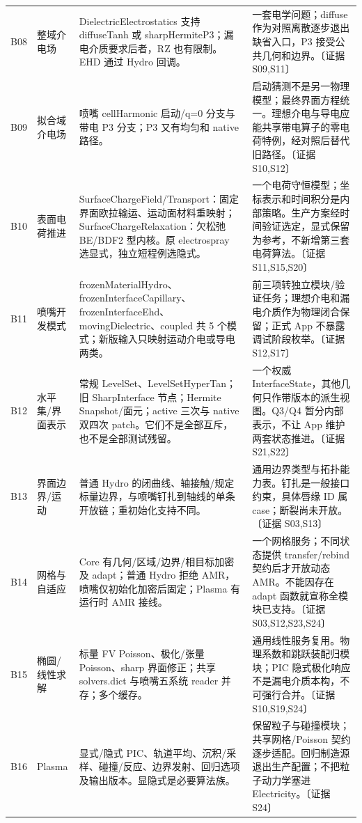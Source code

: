 \documentclass[UTF8,a4paper,11pt,fontset=fandol]{ctexart}
\numberwithin{equation}{section}
\newcommand{\ev}[1]{\textcolor{accent}{〔证据 #1〕}}
\begin{document}
\begin{longtable}{@{}P{.06\textwidth}P{.23\textwidth}P{.33\textwidth}P{.30\textwidth}@{}}
B08 & 整域介电场 & DielectricElectrostatics 支持 diffuseTanh 或 sharpHermiteP3；漏电介质要求后者，RZ 也有限制。EHD 通过 Hydro 回调。 & 一套电学问题；diffuse 作为对照离散逐步退出缺省入口，P3 接受公共几何和边界。\ev{S09,S11}\\
B09 & 拟合域介电场 & 喷嘴 cellHarmonic 启动/q=0 分支与带电 P3 分支；P3 又有均匀和 native 路径。 & 启动猜测不是另一物理模型；最终界面方程统一。理想介电与导电应能共享带电算子的零电荷特例，经对照后替代旧路径。\ev{S10,S12}\\
B10 & 表面电荷推进 & SurfaceChargeField/Transport：固定界面欧拉输运、运动面材料重映射；SurfaceChargeRelaxation：欠松弛 BE/BDF2 型内核。原 electrospray 选显式，独立短程例选隐式。 & 一个电荷守恒模型；坐标表示和时间积分是内部策略。生产方案经时间验证选定，显式保留为参考，不新增第三套电荷算法。\ev{S11,S15,S20}\\
B11 & 喷嘴开发模式 & frozenMaterialHydro、frozenInterfaceCapillary、frozenInterfaceEhd、movingDielectric、coupled 共 5 个模式；新版输入只映射运动介电或导电两类。 & 前三项转独立模块/验证任务；理想介电和漏电介质作为物理闭合保留；正式 App 不暴露调试阶段枚举。\ev{S12,S17}\\
B12 & 水平集/界面表示 & 常规 LevelSet、LevelSetHyperTan；旧 SharpInterface 节点；Hermite Snapshot/面元；active 三次与 native 双四次 patch。它们不是全部互斥，也不是全部测试残留。 & 一个权威 InterfaceState，其他几何只作带版本的派生视图。Q3/Q4 暂分内部表示，不让 App 维护两套状态推进。\ev{S21,S22}\\
B13 & 界面边界/运动 & 普通 Hydro 的闭曲线、轴接触/规定标量边界，与喷嘴钉扎到轴线的单条开放链；重初始化支持不同。 & 通用边界类型与拓扑能力表。钉扎是一般接口约束，具体唇缘 ID 属 case；断裂尚未开放。\ev{S03,S13}\\
B14 & 网格与自适应 & Core 有几何/区域/边界/相目标加密及 adapt；普通 Hydro 拒绝 AMR，喷嘴仅初始化加密后固定；Plasma 有运行时 AMR 接线。 & 一个网格服务；不同状态提供 transfer/rebind 契约后才开放动态 AMR。不能因存在 adapt 函数就宣称全模块已支持。\ev{S03,S12,S23,S24}\\
B15 & 椭圆/线性求解 & 标量 FV Poisson、极化/张量 Poisson、sharp 界面修正；共享 solvers.dict 与喷嘴五系统 reader 并存；多个缓存。 & 通用线性服务复用。物理系数和跳跃装配归模块；PIC 隐式极化响应不是漏电介质本构，不可强行合并。\ev{S10,S19,S24}\\
B16 & Plasma & 显式/隐式 PIC、轨道平均、沉积/采样、碰撞/反应、边界发射、回归选项及输出版本。显隐式是必要算法族。 & 保留粒子与碰撞模块；共享网格/Poisson 契约逐步适配。回归制造源退出生产配置；不把粒子动力学塞进 Electricity。\ev{S24}\\

\end{longtable}
\end{document}
